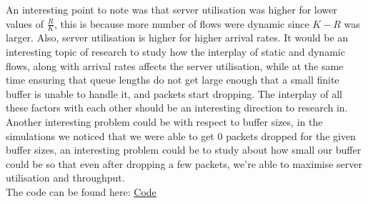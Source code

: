 \documentclass[11pt, a4paper]{article}
\begin{document}
An interesting point to note was that server utilisation was higher for lower values of $\frac{R}{K}$, this is because more number of flows were dynamic since $K-R$ was larger. Also, server utilisation is higher for higher arrival rates. It would be an interesting topic of research to study how the interplay of static and dynamic flows, along with arrival rates affects the server utilisation, while at the same time ensuring that queue lengths do not get large enough that a small finite buffer is unable to handle it, and packets start dropping. The interplay of all these factors with each other should be an interesting direction to research in. \\Another interesting problem could be with respect to buffer sizes, in the simulations we noticed that we were able to get $0$ packets dropped for the given buffer sizes, an interesting problem could be to study about how small our buffer could be so that even after dropping a few packets, we're able to maximise server utilisation and throughput. \\
The code can be found here: \href{https://drive.google.com/drive/folders/1NdwyRu0YszZP-SYvFp2CQcfdz0ehORMg?usp=sharing}{Code}\\
\end{document}
